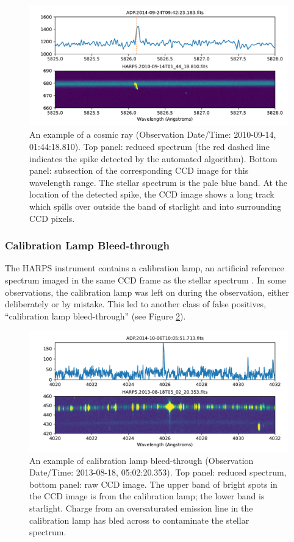 \documentclass[twocolumn]{aastex701}
\begin{document}
\begin{figure}
    \centering
    \includegraphics[width=\textwidth]{clean-figures/Cosmic_ray_example.pdf}
    \caption{An example of a cosmic ray (Observation Date/Time: 2010-09-14, 01:44:18.810). Top panel: reduced spectrum (the red dashed line indicates the spike detected by the automated algorithm).  Bottom panel: subsection of the corresponding CCD image for this wavelength range. The stellar spectrum is the pale blue band. At the location of the detected spike, the CCD image shows a long track which spills over outside the band of starlight and into surrounding CCD pixels.}
    \label{fig:Cosmic_ray_example}
\end{figure}

\subsubsection{Calibration Lamp Bleed-through}
\label{s:bleedthrough}
 The HARPS instrument contains a calibration lamp, an artificial reference spectrum imaged in the same CCD frame as the stellar spectrum \citep{HARPS_specs}. In some observations, the calibration lamp was left on during the observation, either deliberately or by mistake.  This led to another class of false positives, ``calibration lamp bleed-through'' (see Figure \ref{fig:bleedthrough}).
 
\begin{figure}
    \centering
    \includegraphics[width=\textwidth]{clean-figures/bleedthrough.pdf}
    \caption{An example of calibration lamp bleed-through (Observation Date/Time: 2013-08-18, 05:02:20.353). Top panel: reduced spectrum, bottom panel: raw CCD image. The upper band of bright spots in the CCD image is from the calibration lamp; the lower band is starlight.  Charge from an oversaturated emission line in the calibration lamp has bled across to contaminate the stellar spectrum.}
    \label{fig:bleedthrough}
\end{figure}
\end{document}
